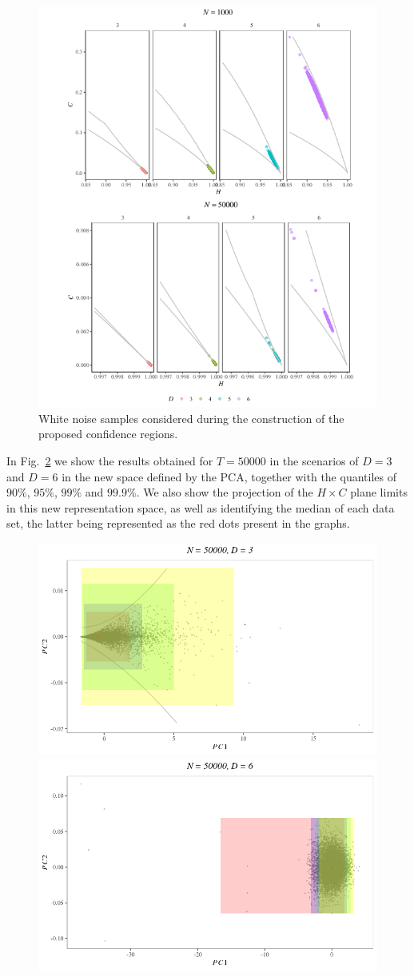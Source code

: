 \begin{figure}[H]
    \centering
    \includegraphics[width=\linewidth]{Figures/Points-PDF.png}
    \caption{White noise samples considered during the construction of the proposed confidence regions.}
    \label{fig:white-noise}
\end{figure}

In Fig.~\ref{fig:HC-PCA} we show the results obtained for $T = 50000$ in the scenarios of $D = 3$ and $D = 6$ in the new space defined by the PCA, together with the quantiles of $90\%$, $95\%$, $99\%$ and $99.9\%$.
We also show the projection of the $H \times C$ plane limits in this new representation space, as well as identifying the median of each data set, the latter being represented as the red dots present in the graphs.

\begin{figure}[H]
	\centering
	\includegraphics[width=.45\linewidth]{Figures/HC-PCA-Trozos-D3N50k.png}
	\includegraphics[width=.45\linewidth]{Figures/HC-PCA-Trozos-D6N50k.png}
	\caption{}
	\label{fig:HC-PCA}
\end{figure} 

